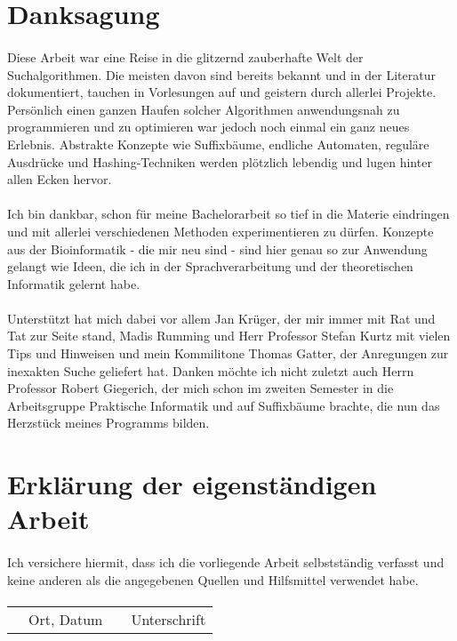 \newpage

\section*{Danksagung}

\paragraph{} Diese Arbeit war eine Reise in die glitzernd zauberhafte Welt der Suchalgorithmen. Die meisten davon sind bereits bekannt und in der Literatur dokumentiert, tauchen in Vorlesungen auf und geistern durch allerlei Projekte. Persönlich einen ganzen Haufen solcher Algorithmen anwendungsnah zu programmieren und zu optimieren war jedoch noch einmal ein ganz neues Erlebnis. Abstrakte Konzepte wie Suffixbäume, endliche Automaten, reguläre Ausdrücke und Hashing-Techniken werden plötzlich lebendig und lugen hinter allen Ecken hervor.
\paragraph{} Ich bin dankbar, schon für meine Bachelorarbeit so tief in die Materie eindringen und mit allerlei verschiedenen Methoden experimentieren zu dürfen. Konzepte aus der Bioinformatik - die mir neu sind - sind hier genau so zur Anwendung gelangt wie Ideen, die ich in der Sprachverarbeitung und der theoretischen Informatik gelernt habe.
\paragraph{} Unterstützt hat mich dabei vor allem Jan Krüger, der mir immer mit Rat und Tat zur Seite stand, Madis Rumming und Herr Professor Stefan Kurtz mit vielen Tips und Hinweisen und mein Kommilitone Thomas Gatter, der Anregungen zur inexakten Suche geliefert hat. Danken möchte ich nicht zuletzt auch Herrn Professor Robert Giegerich, der mich schon im zweiten Semester in die Arbeitsgruppe Praktische Informatik und auf Suffixbäume brachte, die nun das Herzstück meines Programms bilden.

\newpage

\section*{Erklärung der eigenständigen Arbeit}

\paragraph{} Ich versichere hiermit, dass ich die vorliegende Arbeit selbstständig verfasst und keine
anderen als die angegebenen Quellen und Hilfsmittel verwendet habe.

\paragraph{}
\paragraph{}

\begin{tabularx}{\textwidth}{p{3cm}cp{2cm}X}
\cline{2-4}
 & Ort, Datum & &Unterschrift \\ [0.1cm]
\end{tabularx}